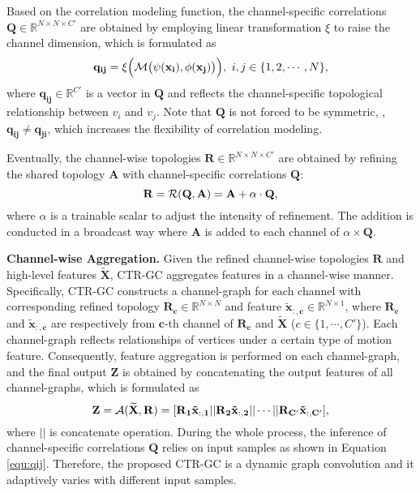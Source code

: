 \documentclass[10pt,twocolumn,letterpaper]{article}
\begin{document}
Based on the correlation modeling function, the channel-specific correlations $\mathbf{Q} \in \mathbb{R}^{N \times N \times C'}$ are obtained by employing linear transformation $\xi$ to raise the channel dimension, which is formulated as
\vspace{-0.16cm}
\begin{equation}
\vspace{-0.16cm}
\mathbf{q_{ij}}=\xi\Big(\mathcal{M}\big(\psi(\mathbf{x_i}), \phi(\mathbf{x_j})\big)\Big),\ i,j \in \{1,2,\cdots,N\},
\label{equ:qij}
\end{equation}
where $\mathbf{q_{ij}} \in \mathbb{R}^{C'}$ is a vector in $\mathbf{Q}$ and reflects the channel-specific topological relationship between $v_i$ and $v_j$. Note that $\mathbf{Q}$ is not forced to be symmetric, \ie, $\mathbf{q_{ij}} \neq\mathbf{q_{ji}}$, which increases the flexibility of correlation modeling.

Eventually, the channel-wise topologies $\mathbf{R} \in \mathbb{R}^{N \times N \times C'}$ are obtained by refining the shared topology $\mathbf{A}$ with channel-specific correlations $\mathbf{Q}$:
\vspace{-0.16cm}
\begin{equation}
\vspace{-0.16cm}
\mathbf{R}= \mathcal{R}(\mathbf{Q}, \mathbf{A}) =\mathbf{A} + \alpha \cdot \mathbf{Q},
\end{equation}
where $\alpha$ is a trainable scalar to adjust the intensity of refinement. The addition is conducted in a broadcast way where $\mathbf{A}$ is added to each channel of $\alpha \times \mathbf{Q}$.

\noindent \textbf{Channel-wise Aggregation.} Given the refined channel-wise topologies $\mathbf{R}$ and high-level features $\mathbf{\widetilde{X}}$, CTR-GC aggregates features in a channel-wise manner. Specifically, CTR-GC constructs a channel-graph for each channel with corresponding refined topology $\mathbf{R_c} \in \mathbb{R}^{N \times N}$ and feature $\mathbf{\tilde{x}_{:,c}} \in \mathbb{R}^{N \times 1}$, where $\mathbf{R_c}$ and $\mathbf{\tilde{x}_{:,c}}$ are respectively from $\mathbf{c}$-th channel of $\mathbf{R_c}$ and $\mathbf{\widetilde{X}}$ ($c\in\{ 1,\cdots,C'\}$). Each channel-graph reflects relationships of vertices under a certain type of motion feature. Consequently, feature aggregation is performed on each channel-graph, and the final output $\mathbf{Z}$ is obtained by concatenating the output features of all channel-graphs, which is formulated as
\vspace{-0.15cm}
\begin{equation}
\vspace{-0.15cm}
\label{equ:hammada}
\mathbf{Z}=\mathcal{A}(\mathbf{\widetilde{X},R})=[\mathbf{R_1} \mathbf{\tilde{x}_{:,1}} ||\mathbf{R_2} \mathbf{\tilde{x}_{:,2}}||\cdots||\mathbf{R_{C'}} \mathbf{\tilde{x}_{:,C'}}],
\end{equation}
where $||$ is concatenate operation. During the whole process, the inference of channel-specific correlations $\mathbf{Q}$ relies on input samples as shown in Equation \ref{equ:qij}. Therefore, the proposed CTR-GC is a dynamic graph convolution and it adaptively varies with different input samples.
\end{document}
